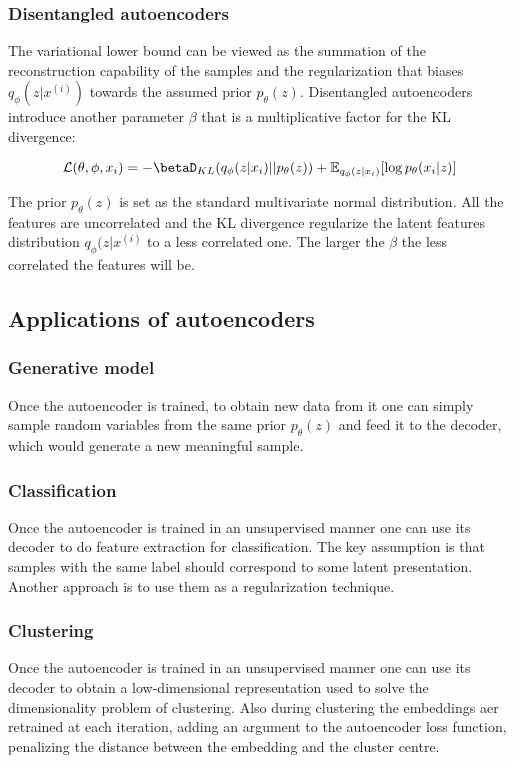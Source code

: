 		\subsubsection{Disentangled autoencoders}
		The variational lower bound can be viewed as the summation of the reconstruction capability of the samples and the regularization that biases $q_\phi(z|x^{(i)})$ towards the assumed prior $p_\theta(z)$.
		Disentangled autoencoders introduce another parameter $\beta$ that is a multiplicative factor for the KL divergence:

		$$\mathcal{L}(\theta, \phi, x_i) = -\betaD_{KL}(q_\phi(z|x_i)||p_\theta(z)) + \mathbb{E}_{q_\phi(z|x_i)}[\log p_\theta(x_i|z)]$$

		The prior $p_\theta(z)$ is set as the standard multivariate normal distribution.
		All the features are uncorrelated and the KL divergence regularize the latent features distribution $q_\phi(z|x^{(i)}$ to a less correlated one.
		The larger the $\beta$ the less correlated the features will be.

	\subsection{Applications of autoencoders}

		\subsubsection{Generative model}
		Once the autoencoder is trained, to obtain new data from it one can simply sample random variables from the same prior $p_\theta(z)$ and feed it to the decoder, which would generate a new meaningful sample.

		\subsubsection{Classification}
		Once the autoencoder is trained in an unsupervised manner one can use its decoder to do feature extraction for classification.
		The key assumption is that samples with the same label should correspond to some latent presentation.
		Another approach is to use them as a regularization technique.

		\subsubsection{Clustering}
		Once the autoencoder is trained in an unsupervised manner one can use its decoder to obtain a low-dimensional representation used to solve the dimensionality problem of clustering.
		Also during clustering the embeddings aer retrained at each iteration, adding an argument to the autoencoder loss function, penalizing the distance between the embedding and the cluster centre.

